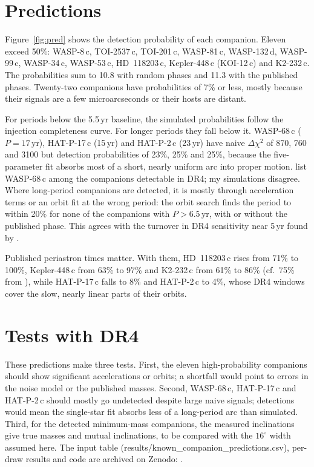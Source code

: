 \documentclass{aastex701}
\begin{document}
\section{Predictions}
Figure~\ref{fig:pred} shows the detection probability of each companion. Eleven exceed 50\%:
WASP-8\,c, TOI-2537\,c, TOI-201\,c, WASP-81\,c, WASP-132\,d, WASP-99\,c, WASP-34\,c, WASP-53\,c,
HD~118203\,c, Kepler-448\,c (KOI-12\,c) and K2-232\,c. The probabilities sum to 10.8 with
random phases and 11.3 with the published phases.
Twenty-two companions have probabilities of 7\% or less, mostly because their signals are a few
microarcseconds or their hosts are distant.

For periods below the 5.5\,yr baseline, the simulated probabilities follow the injection
completeness curve. For longer periods they fall below it. WASP-68\,c ($P=17$\,yr), HAT-P-17\,c
(15\,yr) and HAT-P-2\,c (23\,yr) have naive $\Delta\chi^2$ of 870, 760 and 3100 but detection
probabilities of 23\%, 25\% and 25\%, because the five-parameter fit absorbs most of a short,
nearly uniform arc into proper motion. \citet{parc2026} list WASP-68\,c among the companions
detectable in DR4; my simulations disagree. Where long-period companions are detected, it is
mostly through acceleration terms or an orbit fit at the wrong period: the orbit search finds the
period to within 20\% for none of the companions with $P>6.5$\,yr, with or without the published phase. This agrees with the
turnover in DR4 sensitivity near 5\,yr found by \citet{greenfield2026}.

Published periastron times matter. With them, HD~118203\,c rises from 71\% to 100\%,
Kepler-448\,c from 63\% to 97\% and K2-232\,c from 61\% to 86\% (cf.\ 75\% from
\citealt{ranshaw2026}), while HAT-P-17\,c falls to 8\% and HAT-P-2\,c to 4\%, whose DR4 windows
cover the slow, nearly linear parts of their orbits.

\section{Tests with DR4}
These predictions make three tests. First, the eleven high-probability companions should show
significant accelerations or orbits; a shortfall would point to errors in the noise model or the
published masses. Second, WASP-68\,c, HAT-P-17\,c and HAT-P-2\,c should mostly go undetected
despite large naive signals; detections would mean the single-star fit absorbs less of a
long-period arc than simulated. Third, for the detected minimum-mass companions, the measured
inclinations give true masses and mutual inclinations, to be compared with the $16^\circ$ width
assumed here. The input table (results/known\_companion\_predictions.csv), per-draw results and
code are archived on Zenodo: .
\end{document}
